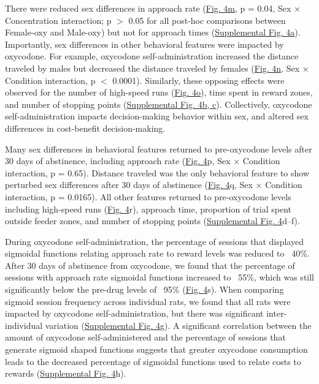 \documentclass{article}
\begin{document}
\vspace{1em}

There were reduced sex differences in approach rate (\hyperref[fig:Record_main_4]{Fig. 4m}, p = 0.04, Sex × Concentration interaction; p $>$ 0.05 for all post-hoc comparisons between Female-oxy and Male-oxy) but not for approach times (\hyperref[fig:Record_SI_4]{Supplemental Fig. 4a}). Importantly, sex differences in other behavioral features were impacted by oxycodone. For example, oxycodone self-administration increased the distance traveled by males but decreased the distance traveled by females (\hyperref[fig:Record_main_4]{Fig. 4n}, Sex × Condition interaction, p $<$ 0.0001). Similarly, these opposing effects were observed for the number of high-speed runs (\hyperref[fig:Record_main_4]{Fig. 4o}), time spent in reward zones, and number of stopping points (\hyperref[fig:Record_SI_4]{Supplemental Fig. 4b, c}). Collectively, oxycodone self-administration impacts decision-making behavior within sex, and altered sex differences in cost-benefit decision-making.

\vspace{1em}

Many sex differences in behavioral features returned to pre-oxycodone levels after 30 days of abstinence, including approach rate (\hyperref[fig:Record_main_4]{Fig. 4}p, Sex × Condition interaction, p = 0.65). Distance traveled was the only behavioral feature to show perturbed sex differences after 30 days of abstinence (\hyperref[fig:Record_main_4]{Fig. 4}q, Sex × Condition interaction, p = 0.0165). All other features returned to pre-oxycodone levels including high-speed runs (\hyperref[fig:Record_main_4]{Fig. 4}r), approach time, proportion of trial spent outside feeder zones, and number of stopping points (\hyperref[fig:Record_SI_4]{Supplemental Fig. 4}d–f).

\vspace{1em}

During oxycodone self-administration, the percentage of sessions that displayed sigmoidal functions relating approach rate to reward levels was reduced to ~40\%. After 30 days of abstinence from oxycodone, we found that the percentage of sessions with approach rate sigmoidal functions increased to ~55\%, which was still significantly below the pre-drug levels of ~95\% (\hyperref[fig:Record_main_4]{Fig. 4}s). When comparing sigmoid session frequency across individual rats, we found that all rats were impacted by oxycodone self-administration, but there was significant inter-individual variation (\hyperref[fig:Record_SI_4]{Supplemental Fig. 4}g). A significant correlation between the amount of oxycodone self-administered and the percentage of sessions that generate sigmoid shaped functions suggests that greater oxycodone consumption leads to the decreased percentage of sigmoidal functions used to relate costs to rewards (\hyperref[fig:Record_SI_4]{Supplemental Fig. 4}h).
\end{document}
